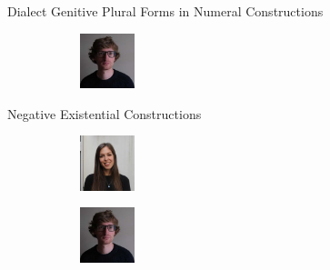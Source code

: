 \documentclass[
  ignorenonframetext,
  t]{beamer}
\begin{document}
\begin{frame}{Dialect Genitive Plural Forms in Numeral Constructions}
\begin{figure}
\begin{minipage}{0.33\linewidth}
\begin{figure}[H]
\end{figure}%

\end{minipage}%
%
\begin{minipage}{0.33\linewidth}

\begin{figure}[H]

{\centering \includegraphics[width=0.63in,height=\textheight]{images/moroz.jpeg}

}


\end{figure}%

\end{minipage}%

\end{figure}%
\end{frame}

\begin{frame}{Negative Existential Constructions}
\label{negative-existential-constructions}
\begin{figure}

\begin{minipage}{0.33\linewidth}

\begin{figure}[H]

{\centering \includegraphics[width=0.63in,height=\textheight]{images/naccarato.jpg}

}


\end{figure}%

\end{minipage}%
%
\begin{minipage}{0.33\linewidth}

\begin{figure}[H]

{\centering \includegraphics[width=0.63in,height=\textheight]{images/moroz.jpeg}

}


\end{figure}%

\end{minipage}%

\end{figure}%
\end{frame}
\end{document}
